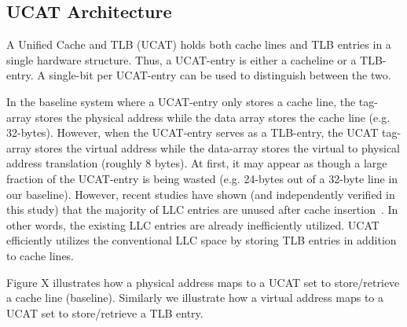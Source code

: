 \subsection{UCAT Architecture}

\noindent A Unified Cache and TLB (UCAT) holds both cache lines and
TLB entries in a single hardware structure. Thus, a UCAT-entry is
either a cacheline or a TLB-entry. A single-bit per UCAT-entry can be
used to distinguish between the two.

In the baseline system where a UCAT-entry only stores a cache line,
the tag-array stores the physical address while the data array stores
the cache line (e.g. 32-bytes). However, when the UCAT-entry serves as
a TLB-entry, the UCAT tag-array stores the virtual address while the
data-array stores the virtual to physical address translation (roughly
8 bytes). At first, it may appear as though a large fraction of the
UCAT-entry is being wasted (e.g. 24-bytes out of a 32-byte line in our
baseline). However, recent studies have shown (and independently
verified in this study) that the majority of LLC entries are unused
after cache insertion~\cite{}. In other words, the existing LLC
entries are already inefficiently utilized. UCAT efficiently utilizes
the conventional LLC space by storing TLB entries in addition to cache
lines.

Figure X illustrates how a physical address maps to a UCAT set to
store/retrieve a cache line (baseline). Similarly we illustrate how a
virtual address maps to a UCAT set to store/retrieve a TLB entry.

% 
% 

